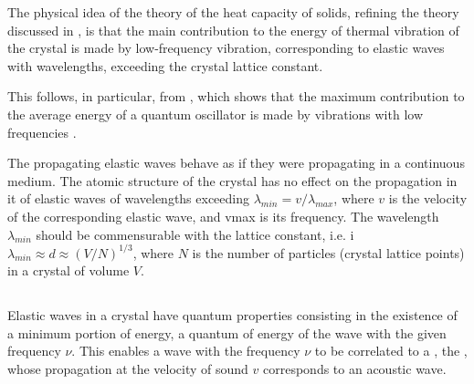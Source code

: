 The physical idea of the theory of the heat capacity of solids, refining the theory discussed in , is that the main contribution to the energy of thermal vibration of the crystal is made by low-frequency vibration, corresponding to elastic waves with wavelengths, exceeding the crystal lattice constant.

This follows, in particular, from , which shows that the maximum contribution to the average energy of a quantum oscillator is made by vibrations with low frequencies .

The propagating elastic waves behave as if they were propagating in a continuous medium. The atomic structure of the crystal has no effect on the propagation in it of elastic waves of wavelengths exceeding $\lambda_{min} = v / \lambda_{max}$, where $v$ is the velocity of the corresponding elastic wave, and vmax is its frequency. The wavelength $\lambda_{min}$ should be commensurable with the lattice constant, i.e. i $\lambda_{min} \approx d \approx (V/N)^{1/3}$, where $N$ is the number of particles (crystal lattice points) in a crystal of volume $V$.

\subsection{}\label{41.7.5} Elastic waves in a crystal have quantum properties consisting in the existence of a minimum portion of energy, a quantum of energy of the wave with the given frequency $\nu$. This enables a wave with the frequency $\nu$ to be correlated to a , the , whose propagation at the velocity of sound $v$ corresponds to an acoustic wave.

